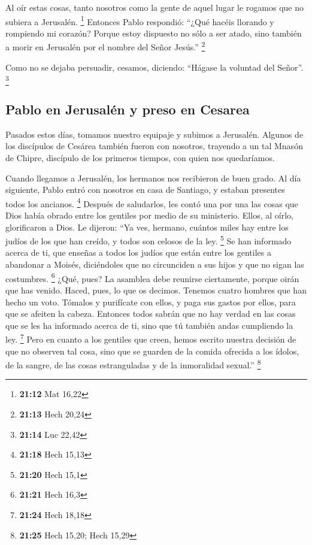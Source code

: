 \begin{paracol}{2}
 Al oír estas cosas, tanto nosotros como la gente de
aquel lugar le rogamos que no subiera a Jerusalén. \footnote{\textbf{21:12}
  Mat 16,22}  Entonces Pablo respondió: ``¿Qué hacéis
llorando y rompiendo mi corazón? Porque estoy dispuesto no sólo a ser
atado, sino también a morir en Jerusalén por el nombre del Señor
Jesús.'' \footnote{\textbf{21:13} Hech 20,24}

 Como no se dejaba persuadir, cesamos, diciendo: ``Hágase
la voluntad del Señor''. \footnote{\textbf{21:14} Luc 22,42}

\hypertarget{pablo-en-jerusaluxe9n-y-preso-en-cesarea}{%
\subsection{Pablo en Jerusalén y preso en
Cesarea}\label{pablo-en-jerusaluxe9n-y-preso-en-cesarea}}

 Pasados estos días, tomamos nuestro equipaje y subimos a
Jerusalén.  Algunos de los discípulos de Cesárea también
fueron con nosotros, trayendo a un tal Mnasón de Chipre, discípulo de
los primeros tiempos, con quien nos quedaríamos.

 Cuando llegamos a Jerusalén, los hermanos nos recibieron
de buen grado.  Al día siguiente, Pablo entró con
nosotros en casa de Santiago, y estaban presentes todos los ancianos.
\footnote{\textbf{21:18} Hech 15,13}  Después de
saludarlos, les contó una por una las cosas que Dios había obrado entre
los gentiles por medio de su ministerio.  Ellos, al
oírlo, glorificaron a Dios. Le dijeron: ``Ya ves, hermano, cuántos miles
hay entre los judíos de los que han creído, y todos son celosos de la
ley. \footnote{\textbf{21:20} Hech 15,1}  Se han
informado acerca de ti, que enseñas a todos los judíos que están entre
los gentiles a abandonar a Moisés, diciéndoles que no circunciden a sus
hijos y que no sigan las costumbres. \footnote{\textbf{21:21} Hech 16,3}
 ¿Qué, pues? La asamblea debe reunirse ciertamente,
porque oirán que has venido.  Haced, pues, lo que os
decimos. Tenemos cuatro hombres que han hecho un voto. 
Tómalos y purifícate con ellos, y paga sus gastos por ellos, para que se
afeiten la cabeza. Entonces todos sabrán que no hay verdad en las cosas
que se les ha informado acerca de ti, sino que tú también andas
cumpliendo la ley. \footnote{\textbf{21:24} Hech 18,18} 
Pero en cuanto a los gentiles que creen, hemos escrito nuestra decisión
de que no observen tal cosa, sino que se guarden de la comida ofrecida a
los ídolos, de la sangre, de las cosas estranguladas y de la inmoralidad
sexual.'' \footnote{\textbf{21:25} Hech 15,20; Hech 15,29}


\end{paracol}
